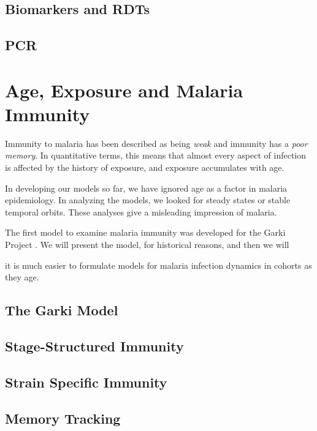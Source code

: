 \documentclass[
]{book}
\begin{document}
\section{Biomarkers and RDTs}\label{biomarkers-and-rdts}

\section{PCR}\label{pcr}

\chapter{Age, Exposure and Malaria Immunity}\label{age-exposure-and-malaria-immunity}

Immunity to malaria has been described as being \emph{weak} and immunity has a \emph{poor memory}. In quantitative terms, this means that almost every aspect of infection is affected by the history of exposure, and exposure accumulates with age.

In developing our models so far, we have ignored age as a factor in malaria epidemiology. In analyzing the models, we looked for steady states or stable temporal orbits. These analyses give a misleading impression of malaria.

The first model to examine malaria immunity was developed for the Garki Project \autocite{DietzK1974GarkiModel}. We will present the model, for historical reasons, and then we will

it is much easier to formulate models for malaria infection dynamics in cohorts as they age.

\section{The Garki Model}\label{the-garki-model}

\section{Stage-Structured Immunity}\label{stage-structured-immunity}

\section{Strain Specific Immunity}\label{strain-specific-immunity}

\section{Memory Tracking}\label{memory-tracking}
\end{document}
